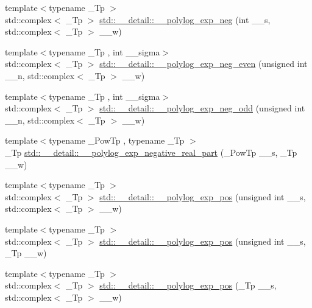 \begin{DoxyCompactItemize}
\item 
{\footnotesize template$<$typename \+\_\+\+Tp $>$ }\\std\+::complex$<$ \+\_\+\+Tp $>$ \hyperlink{namespacestd_1_1____detail_aac54584aa89fef6a08a258ad6e2a75f5}{std\+::\+\_\+\+\_\+detail\+::\+\_\+\+\_\+polylog\+\_\+exp\+\_\+neg} (int \+\_\+\+\_\+s, std\+::complex$<$ \+\_\+\+Tp $>$ \+\_\+\+\_\+w)
\item 
{\footnotesize template$<$typename \+\_\+\+Tp , int \+\_\+\+\_\+sigma$>$ }\\std\+::complex$<$ \+\_\+\+Tp $>$ \hyperlink{namespacestd_1_1____detail_affdff8c867d264b62a64427e53f5b9aa}{std\+::\+\_\+\+\_\+detail\+::\+\_\+\+\_\+polylog\+\_\+exp\+\_\+neg\+\_\+even} (unsigned int \+\_\+\+\_\+n, std\+::complex$<$ \+\_\+\+Tp $>$ \+\_\+\+\_\+w)
\item 
{\footnotesize template$<$typename \+\_\+\+Tp , int \+\_\+\+\_\+sigma$>$ }\\std\+::complex$<$ \+\_\+\+Tp $>$ \hyperlink{namespacestd_1_1____detail_a114ec67e6802a402064b16a9a77f0863}{std\+::\+\_\+\+\_\+detail\+::\+\_\+\+\_\+polylog\+\_\+exp\+\_\+neg\+\_\+odd} (unsigned int \+\_\+\+\_\+n, std\+::complex$<$ \+\_\+\+Tp $>$ \+\_\+\+\_\+w)
\item 
{\footnotesize template$<$typename \+\_\+\+Pow\+Tp , typename \+\_\+\+Tp $>$ }\\\+\_\+\+Tp \hyperlink{namespacestd_1_1____detail_a466240361bcf30941d84a8fc3cd91cf9}{std\+::\+\_\+\+\_\+detail\+::\+\_\+\+\_\+polylog\+\_\+exp\+\_\+negative\+\_\+real\+\_\+part} (\+\_\+\+Pow\+Tp \+\_\+\+\_\+s, \+\_\+\+Tp \+\_\+\+\_\+w)
\item 
{\footnotesize template$<$typename \+\_\+\+Tp $>$ }\\std\+::complex$<$ \+\_\+\+Tp $>$ \hyperlink{namespacestd_1_1____detail_a0327d2970eba3a0a2d73c71c7a77701c}{std\+::\+\_\+\+\_\+detail\+::\+\_\+\+\_\+polylog\+\_\+exp\+\_\+pos} (unsigned int \+\_\+\+\_\+s, std\+::complex$<$ \+\_\+\+Tp $>$ \+\_\+\+\_\+w)
\item 
{\footnotesize template$<$typename \+\_\+\+Tp $>$ }\\std\+::complex$<$ \+\_\+\+Tp $>$ \hyperlink{namespacestd_1_1____detail_ab13a4be6685dd222b654da3297342d7e}{std\+::\+\_\+\+\_\+detail\+::\+\_\+\+\_\+polylog\+\_\+exp\+\_\+pos} (unsigned int \+\_\+\+\_\+s, \+\_\+\+Tp \+\_\+\+\_\+w)
\item 
{\footnotesize template$<$typename \+\_\+\+Tp $>$ }\\std\+::complex$<$ \+\_\+\+Tp $>$ \hyperlink{namespacestd_1_1____detail_a56b0f5bc6f4955469fd5f83105cbd466}{std\+::\+\_\+\+\_\+detail\+::\+\_\+\+\_\+polylog\+\_\+exp\+\_\+pos} (\+\_\+\+Tp \+\_\+\+\_\+s, std\+::complex$<$ \+\_\+\+Tp $>$ \+\_\+\+\_\+w)

\end{DoxyCompactItemize}
